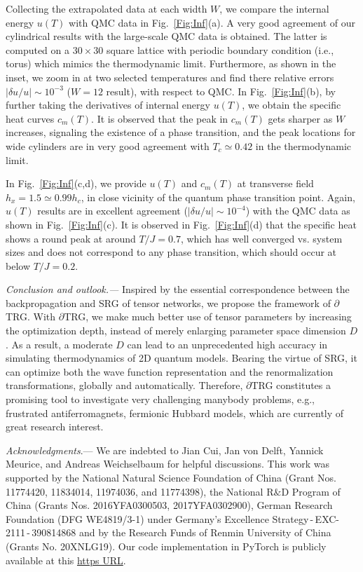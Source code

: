 \documentclass[aps,prx,twocolumn,showpacs,psfig,superscriptaddress,longbibliography]{revtex4-1}
\newcommand{\Fig}[1]{Fig.~\ref{#1}}
\def\dTRG{$\partial$TRG\xspace}
\begin{document}
Collecting the extrapolated data at each width $W$, we compare the internal energy $u(T)$ with QMC data in \Fig{Fig:Inf}(a). A very good agreement of our cylindrical results with the large-scale QMC data is obtained. The latter is computed on a $30\times30$ square lattice with periodic boundary condition (i.e., torus) which mimics the thermodynamic limit. Furthermore, as shown in the inset, we zoom in at two selected temperatures and find there relative errors $|\delta u/u|\sim10^{-3}$ ($W=12$ result), with respect to QMC. In \Fig{Fig:Inf}(b), by further taking the derivatives of internal energy $u(T)$, we obtain the specific heat curves $c_m(T)$. It is observed that the peak in $c_m(T)$ gets sharper as $W$ increases, signaling the existence of a phase transition, and the peak locations for wide cylinders are in very good agreement with $T_c\simeq0.42$ in the thermodynamic limit.

In \Fig{Fig:Inf}(c,d), we provide $u(T)$ and $c_m(T)$ at transverse field $h_x=1.5\simeq 0.99h_c$, in close vicinity of the quantum phase transition point. Again, $u(T)$ results are in excellent agreement ($|\delta u/u|\sim10^{-4}$) with the QMC data as shown in \Fig{Fig:Inf}(c). It is observed in \Fig{Fig:Inf}(d) that the specific heat shows a round peak at around $T/J=0.7$, which has well converged vs. system sizes and does not correspond to any phase transition, which should occur at below $T/J=0.2$.


\textit{Conclusion and outlook.---} 
Inspired by the essential correspondence between the backpropagation and SRG of tensor networks, we propose the framework of $\partial$TRG. With \dTRG, we make much better use of tensor parameters by increasing the optimization depth, instead of merely enlarging parameter space dimension $D$. As a result, a moderate $D$ can lead to an unprecedented high accuracy in simulating thermodynamics of 2D quantum models.
Bearing the virtue of SRG, it can optimize both the wave function representation and the renormalization transformations, globally and automatically.
 Therefore, \dTRG constitutes a promising tool to investigate very challenging manybody problems, e.g., frustrated antiferromagnets, fermionic Hubbard models, which are currently of great research interest.

\textit{Acknowledgments}.--- We are indebted to Jian Cui, Jan von Delft, Yannick Meurice, and Andreas Weichselbaum for helpful discussions. This work was supported by the National Natural Science Foundation of China (Grant Nos. 11774420, 11834014, 11974036, and 11774398), the National R$\&$D Program of China (Grants Nos. 2016YFA0300503, 2017YFA0302900), German Research Foundation (DFG WE4819/3-1) under Germany's Excellence Strategy\,-\,EXC-2111\,-\,390814868 and by the Research Funds of Renmin University of China (Grants No. 20XNLG19).
Our code implementation in PyTorch is publicly available at this \href{https://github.com/TensorBFS/dTRG}{https URL}.
\end{document}
